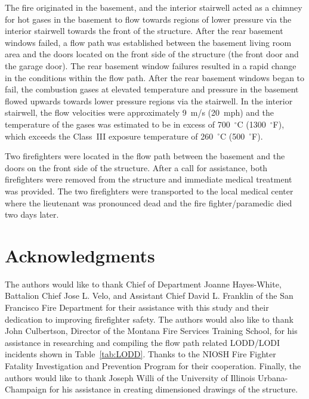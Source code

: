 \documentclass[12pt,oneside]{book}
\begin{document}
The fire originated in the basement, and the interior stairwell acted as a chimney for hot gases in the basement to flow towards regions of lower pressure via the interior stairwell towards the front of the structure. After the rear basement windows failed, a flow path was established between the basement living room area and the doors located on the front side of the structure (the front door and the garage door). The rear basement window failures resulted in a rapid change in the conditions within the flow path. After the rear basement windows began to fail, the combustion gases at elevated temperature and pressure in the basement flowed upwards towards lower pressure regions via the stairwell. In the interior stairwell, the flow velocities were approximately 9~m/s (20~mph) and the temperature of the gases was estimated to be in excess of 700~$^{\circ}$C (1300~$^{\circ}$F), which exceeds the Class~III exposure temperature of 260~$^{\circ}$C (500~$^{\circ}$F).

Two firefighters were located in the flow path between the basement and the doors on the front side of the structure. After a call for assistance, both firefighters were removed from the structure and immediate medical treatment was provided. The two firefighters were transported to the local medical center where the lieutenant was pronounced dead and the fire fighter/paramedic died two days later.


\chapter*{Acknowledgments}

The authors would like to thank Chief of Department Joanne Hayes-White, Battalion Chief Jose L. Velo, and Assistant Chief David L. Franklin of the San Francisco Fire Department for their assistance with this study and their dedication to improving firefighter safety. The authors would also like to thank John Culbertson, Director of the Montana Fire Services Training School, for his assistance in researching and compiling the flow path related LODD/LODI incidents shown in Table~\ref{tab:LODD}. Thanks to the NIOSH Fire Fighter Fatality Investigation and Prevention Program for their cooperation. Finally, the authors would like to thank Joseph Willi of the University of Illinois Urbana-Champaign for his assistance in creating dimensioned drawings of the structure.


\end{document}
